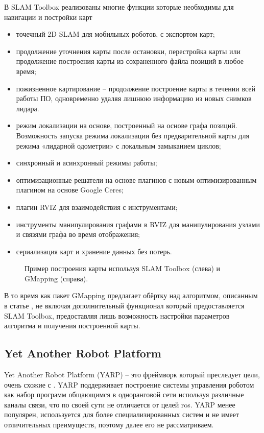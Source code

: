 В SLAM Toolbox реализованы многие функции которые необходимы для навигации и
постройки карт
\begin{itemize}
	\item точечный 2D SLAM для мобильных роботов, с экспортом карт;
	\item продолжение уточнения карты после остановки, перестройка карты или
		продолжение построения карты из сохраненного файла позиций в любое
		время;
	\item пожизненное картирование -- продолжение построение карты  в течении
		всей работы ПО, одновременно удаляя лишнюю информацию из новых снимков
		лидара.
	\item режим локализации на основе, построенный на основе графа позиций.
		Возможность запуска режима локализации без предварительной карты для
		режима «лидарной одометрии» с локальным замыканием циклов;
	\item синхронный и асинхронный режимы работы;
	\item оптимизационные решатели на основе плагинов с новым оптимизированным
		плагином на основе Google Ceres;
	\item плагин RVIZ для взаимодействия с инструментами;
	\item инструменты манипулирования графами в RVIZ для манипулирования узлами
		и связями графа во время отображения;
	\item сериализация карт и хранение данных без потерь.
\end{itemize}

\begin{figure}[h]
\centering
	\caption{Пример построения карты используя SLAM Toolbox (слева) и GMapping
	(справа).}
	\label{ris:map_example}
\end{figure}

В то время как пакет GMapping предлагает обёртку над алгоритмом,
описанным в статье \cite{grisetti2005improving}, не включая дополнительный
функционал который предоставляется SLAM Toolbox, предоставляя лишь возможность настройки параметров алгоритма и получения построенной карты.




\subsection{Yet Another Robot Platform}
Yet Another Robot Platform (YARP) \cite{metta2006yarp} -- это фреймворк который
преследует цели, очень схожие с \ros{}. YARP поддерживает построение системы
управления роботом как набор программ общающимся в одноранговой сети используя
различные каналы связи, что по своей сути не отличается от целей ros{}. YARP
менее популярен, используется для более специализированных систем и не имеет
отличительных преимуществ, поэтому далее его не рассматриваем.


